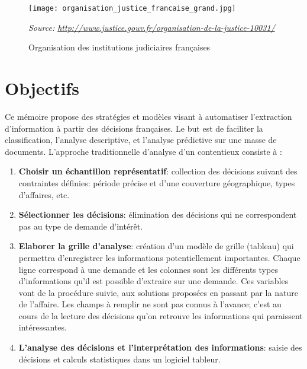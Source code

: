 \begin{figure}[!htb]
	\centering \texttt{[image: organisation\_justice\_francaise\_grand.jpg]}
	
	\textit{\scriptsize{Source: \url{http://www.justice.gouv.fr/organisation-de-la-justice-10031/}}}  
	\caption{Organisation des institutions judiciaires françaises} \label{orgjusticefrance}
\end{figure}

\section{Objectifs}
 Ce mémoire propose des stratégies et modèles visant à automatiser l'extraction d'information à partir des décisions françaises. Le but est de faciliter la classification, l'analyse descriptive, et l'analyse prédictive sur une masse de documents. L'approche traditionnelle d'analyse d'un contentieux \citep{ancel2003expulsion} consiste à :
 \begin{enumerate}
 	\item \textbf{Choisir un échantillon représentatif}: collection des décisions suivant des contraintes définies:  période précise et d'une couverture géographique, types d'affaires, etc.
 	\item \textbf{Sélectionner les décisions}: élimination des décisions qui ne correspondent pas au type de demande d'intérêt.
 	\item \textbf{Elaborer la grille d'analyse}: création d'un modèle de grille (tableau) qui permettra d'enregistrer les informations potentiellement importantes. Chaque ligne correspond à une demande et les colonnes sont les différents types d'informations qu'il est possible d'extraire sur une demande. Ces variables vont de la procédure suivie, aux solutions proposées en passant par la nature de l'affaire. Les champs à remplir ne sont pas connus à l'avance; c'est au cours de la lecture des décisions qu'on retrouve les informations qui paraissent intéressantes.
 	\item \textbf{L'analyse des décisions et l'interprétation des informations}: saisie des décisions et calculs statistiques dans un logiciel tableur.
 \end{enumerate}
 
